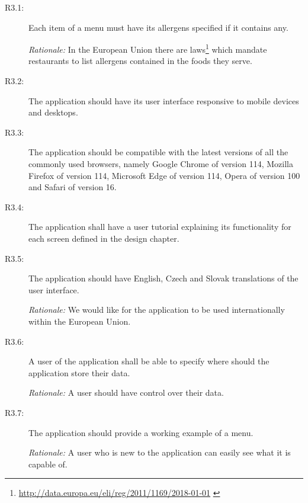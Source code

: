 \begin{description}
    \item [R3.1:] Each item of a menu must have its allergens specified if it contains any.
    
    \emph{Rationale:} In the European Union there are laws\footnote{\url{http://data.europa.eu/eli/reg/2011/1169/2018-01-01}  \label{fnlabel}} which mandate restaurants to list allergens contained in the foods they serve.
    \item [R3.2:] The application should have its user interface responsive to mobile devices and desktops.
    \item [R3.3:] The application should be compatible with the latest versions of all the commonly used browsers, namely Google Chrome of version 114, Mozilla Firefox of version 114, Microsoft Edge of version 114, Opera of version 100 and Safari of version 16.
    \item [R3.4:] The application shall have a user tutorial explaining its functionality for each screen defined in the design chapter.
    \item [R3.5:] The application should have English, Czech and Slovak translations of the user interface.

    \emph{Rationale:} We would like for the application to be used internationally within the European Union.
    \item [R3.6:] A user of the application shall be able to specify where should the application store their data.

    \emph{Rationale:} A user should have control over their data.
    \item [R3.7:] The application should provide a working example of a menu.

    \emph{Rationale:} A user who is new to the application can easily see what it is capable of.
\end{description}

\vspace*{\fill}